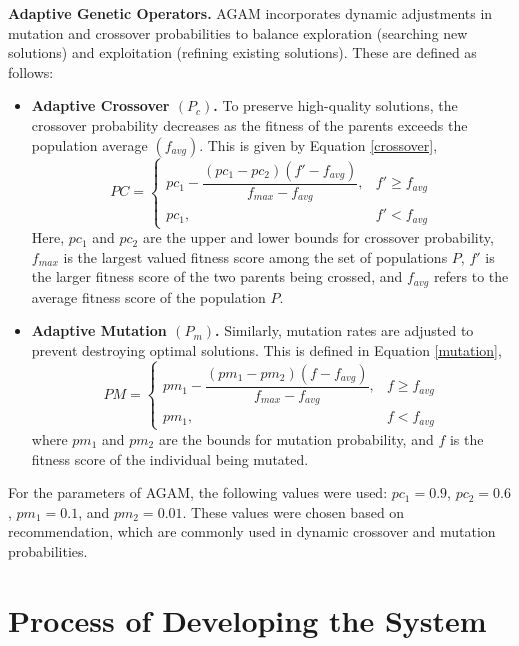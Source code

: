 \textbf{Adaptive Genetic Operators.} AGAM incorporates dynamic adjustments in mutation and crossover probabilities to balance exploration (searching new solutions) and exploitation (refining existing solutions). These are defined as follows:
\begin{itemize}
    \item \textbf{Adaptive Crossover $ ( P _{c} )$.} To preserve high-quality solutions, the crossover probability decreases as the fitness of the parents exceeds the population average $ ( f _{avg} )$. This is given by Equation \ref{crossover},
    \begin{equation}
        \label{crossover}
        PC = \begin{cases}
            pc_1 - \dfrac{(pc_1 - pc_2)(f' - f_{avg})}{f_{max} - f_{avg}}, & f' \ge f_{avg} \\
            pc_1, & f' < f_{avg}
        \end{cases}
    \end{equation}
    Here, $pc_1$ and $pc_2$ are the upper and lower bounds for crossover probability, $f_{max}$ is the largest valued fitness score among the set of populations $P$, $f'$ is the larger fitness score of the two parents being crossed, and $f_{avg}$ refers to the average fitness score of the population $P$. 

    \item \textbf{Adaptive Mutation $ ( P _{m} )$.} Similarly, mutation rates are adjusted to prevent destroying optimal solutions. This is defined in Equation \ref{mutation},
    \begin{equation}
        \label{mutation}
        PM = \begin{cases}
            pm_1 - \dfrac{(pm_1 - pm_2)(f - f_{avg})}{f_{max} - f_{avg}}, & f \ge f_{avg} \\
            pm_1, & f < f_{avg}
        \end{cases}
    \end{equation}
    where $pm_1$ and $pm_2$  are the bounds for mutation probability, and $f$ is the fitness score of the individual being mutated.
\end{itemize}

For the parameters of AGAM, the following values were used: $pc_1 = 0.9$, $pc_2 = 0.6$, $pm_1 = 0.1$, and $pm_2 = 0.01$. These values were chosen based on \textcite{Yochum2020} recommendation, which are commonly used in dynamic crossover and mutation probabilities. 

\section{Process of Developing the System}

